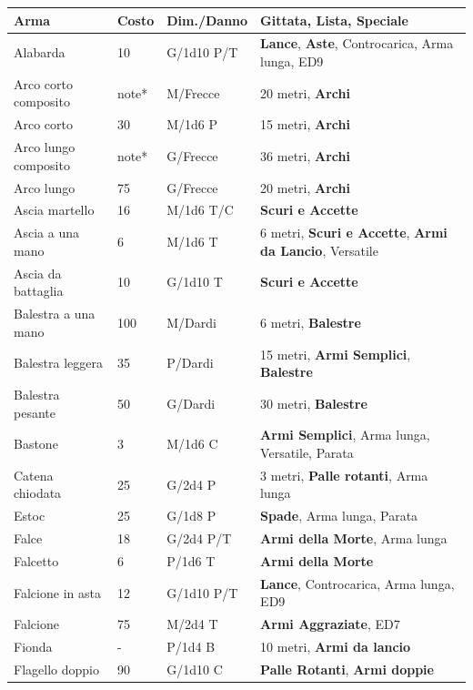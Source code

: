 \noindent\begin{xltabular}{\linewidth}{lllX}
	\toprule
{}\textbf{Arma}&\textbf{Costo}&\textbf{Dim./Danno} & \textbf{Gittata, Lista, Speciale}\\
\toprule
Alabarda& 10 & G/1d10 P/T& \textbf{Lance}, \textbf{Aste}, Controcarica, Arma lunga, ED9 \\
Arco corto composito& note*& M/Frecce& 20 metri, \textbf{Archi}\\
Arco corto& 30 & M/1d6 P& 15 metri, \textbf{Archi}\\
Arco lungo composito& note*& G/Frecce& 36 metri, \textbf{Archi}\\
Arco lungo& 75 & G/Frecce& 20 metri, \textbf{Archi}\\
Ascia martello& 16 & M/1d6 T/C& \textbf{Scuri e Accette}\\
Ascia a una mano& 6 & M/1d6 T& 6 metri, \textbf{Scuri e Accette}, \textbf{Armi da Lancio}, Versatile\\
Ascia da battaglia& 10 & G/1d10 T&\textbf{Scuri e Accette}\\
Balestra a una mano& 100& M/Dardi& 6 metri, \textbf{Balestre}\\
Balestra leggera& 35 & P/Dardi& 15 metri, \textbf{Armi Semplici}, \textbf{Balestre}\\
Balestra pesante& 50 & G/Dardi& 30 metri, \textbf{Balestre}\\
Bastone& 3& M/1d6 C& \textbf{Armi Semplici}, Arma lunga, Versatile, Parata\\
Catena chiodata& 25 & G/2d4 P& 3 metri, \textbf{Palle rotanti}, Arma lunga\\
Estoc& 25& G/1d8 P& \textbf{Spade}, Arma lunga, Parata\\
Falce& 18 & G/2d4 P/T& \textbf{Armi della Morte}, Arma lunga\\
Falcetto& 6& P/1d6 T& \textbf{Armi della Morte}\\
Falcione in asta& 12 & G/1d10 P/T& \textbf{Lance}, Controcarica, Arma lunga, ED9\\
Falcione& 75 & M/2d4 T& \textbf{Armi Aggraziate}, ED7\\
Fionda& -& P/1d4 B& 10 metri, \textbf{Armi da lancio}\\
Flagello doppio& 90 & G/1d10 C& \textbf{Palle Rotanti}, \textbf{Armi doppie}\\

\end{xltabular}
